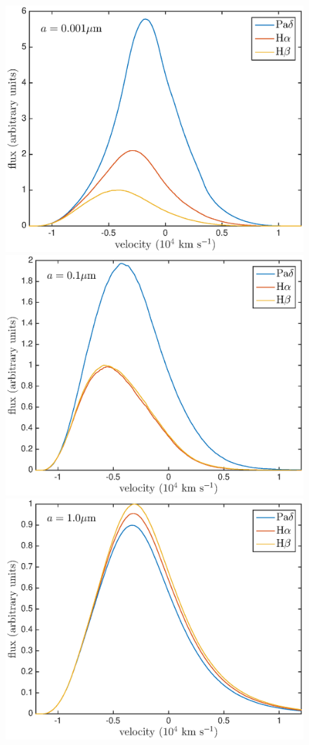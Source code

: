 \documentclass[useAMS,usenatbib,usegraphicx]{mnras}
\begin{document}
\begin{figure}
\includegraphics[trim =30 10 45 15,clip=true,scale=0.35]{a0_001_opt_thick_HaHbPad}
\includegraphics[trim =51 10 45 15,clip=true,scale=0.35]{a0_1_opt_thick_HaHbPad}
\includegraphics[trim =48 10 45 15,clip=true,scale=0.35]{a1_opt_thick_HaHbPad}

\end{figure}
\end{document}
